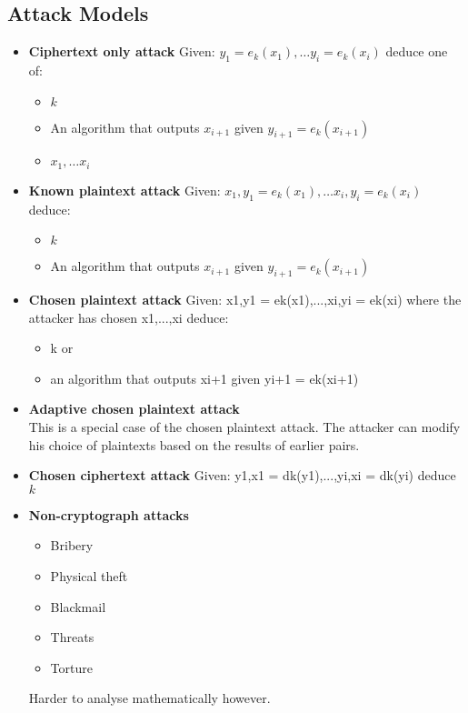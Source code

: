 \subsection{Attack Models}
\begin{itemize}
    \item \textbf{Ciphertext only attack}
        Given: $y_1 = e_k(x_1),\dots y_i = e_k(x_i)$ deduce one of:
        \begin{itemize}
            \item $k$
            \item An algorithm that outputs $x_{i+1}$ given $y_{i+1} = e_k(x_{i+1})$
            \item $x_1,\dots x_i$
        \end{itemize}
    \item \textbf{Known plaintext attack}
        Given: $x_1, y_1 = e_k(x_1),\dots x_i,y_i = e_k(x_i)$ deduce:
        \begin{itemize}
            \item $k$
            \item An algorithm that outputs $x_{i+1}$ given $y_{i+1} = e_k(x_{i+1})$
        \end{itemize}
    \item \textbf{Chosen plaintext attack}
        Given: x1,y1 = ek(x1),...,xi,yi = ek(xi) where the attacker has chosen x1,...,xi deduce:
        \begin{itemize}
            \item k or
            \item an algorithm that outputs xi+1 given yi+1 = ek(xi+1)
        \end{itemize}
    \item \textbf{Adaptive chosen plaintext attack}\\
        This is a special case of the chosen plaintext attack.
        The attacker can modify his choice of plaintexts based on the results of earlier pairs.
    \item \textbf{Chosen ciphertext attack}
        Given: y1,x1 = dk(y1),...,yi,xi = dk(yi) deduce $k$
    \item \textbf{Non-cryptograph attacks}
        \begin{itemize}
            \item Bribery
            \item Physical theft
            \item Blackmail
            \item Threats
            \item Torture
        \end{itemize}
        Harder to analyse mathematically however.
\end{itemize}

